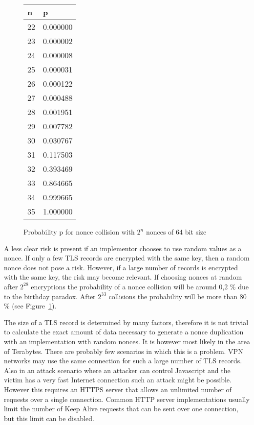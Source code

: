 \documentclass[10pt, a4paper]{article}
\begin{document}
\begin{figure}
\centering
\begin{tabular}{|l|l|}
\hline
\textbf{n} & \textbf{p} \\
\hline
22 & 0.000000 \\
23 & 0.000002 \\
24 & 0.000008 \\
25 & 0.000031 \\
26 & 0.000122 \\
27 & 0.000488 \\
28 & 0.001951 \\
29 & 0.007782 \\
30 & 0.030767 \\
31 & 0.117503 \\
32 & 0.393469 \\
33 & 0.864665 \\
34 & 0.999665 \\
35 & 1.000000 \\
\hline
\end{tabular}
\label{tab:probabilities}
\caption{Probability p for nonce collision with $2^n$ nonces of 64 bit size}
\end{figure}

A less clear risk is present if an implementor chooses to use random values as a nonce. If only
a few TLS records
are encrypted with the same key, then a random nonce does not pose a risk. However, if a large number
of records is encrypted with the same key, the risk may become relevant. If choosing nonces at random after
$2^{28}$ encryptions the probability of a nonce collision
will be around 0,2 \% due to the birthday paradox. After $2^{33}$ collisions the probability will be more
than 80 \% (see Figure~\ref{tab:probabilities}).

The size of a TLS record is determined by many factors, therefore it is not trivial to calculate the exact
amount of data necessary to generate a nonce duplication with an implementation with random nonces. It
is however most likely in the area of Terabytes. There are probably few scenarios in which this is a
problem. VPN networks may use the same connection for such a large number of TLS records. Also in
an attack scenario where an attacker can control Javascript and the victim has a very fast Internet
connection such an attack might be possible. However this requires an HTTPS server that allows an
unlimited number of requests over a single connection. Common HTTP server implementations usually
limit the number of Keep Alive requests that can be sent over one connection, but this limit can
be disabled.
\end{document}
